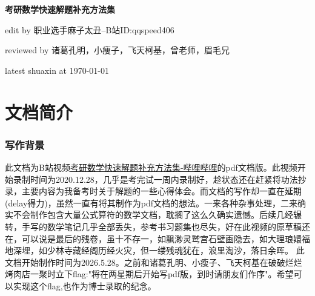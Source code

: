 \documentclass[12pt]{report}
\begin{document}

\begin{titlepage} %
	
	
	\centering %
	
	\vspace*{3cm} 
	{\Huge\bfseries 考研数学快速解题补充方法集} 
	
	\vspace{1.5cm} 
	{\Large edit by 职业选手麻子太丑--B站ID:qqspeed406}
	
	\vspace{1cm}
	
	{\large reviewed by 诸葛孔明，小瘦子，飞天柯基，曾老师，眉毛兄}

    \vspace{0.5cm}

	{ latest shuaxin at \today}
	
	
	
	
	
\end{titlepage} %


   \chapter*{文档简介}
   \thispagestyle{empty} %
   \subsection*{\centering 写作背景}
   此文档为B站视频\href{https://b23.tv/R8F4RW5}{考研数学快速解题补充方法集-哔哩哔哩}的pdf文档版。此视频开始录制时间为2020.12.28，几乎是考完试一周内录制好，趁状态还在赶紧将功法抄录，主要内容为我备考时关于解题的一些心得体会。而文档的写作却一直在延期(delay得力)，虽然一直有将其制作为pdf文档的想法。一来各种杂事处理，二来确实不会制作包含大量公式算符的数学文档，耽搁了这么久确实遗憾。后续几经辗转，手写的数学笔记几乎全部丢失，参考书习题集也尽失，好在此视频的原草稿还在，可以说是最后的残卷，虽十不存一，如飘渺灵鹫宫石壁画隐去，如大理琅嬛福地深埋，如少林寺藏经阁历经火灾，但一缕残魂犹在，浪里淘沙，落日余晖。
   此文档开始制作时间为2026.5.28。之前和诸葛孔明、小瘦子、飞天柯基在破破烂烂烤肉店一聚时立下flag:"将在两星期后开始写pdf版，到时请朋友们作序"。希望可以实现这个flag,也作为博士录取的纪念。
   
\end{document}
